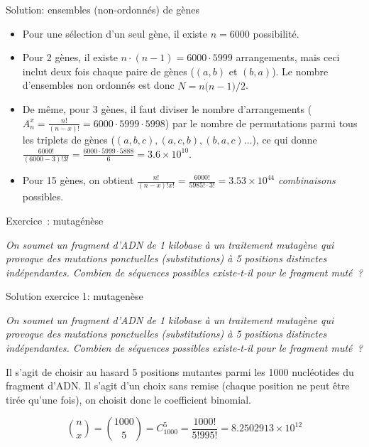 \documentclass[ignorenonframetext,]{beamer}
\providecommand{\tightlist}{%
  \setlength{\itemsep}{0pt}\setlength{\parskip}{0pt}}
\begin{document}
\begin{frame}{Solution: ensembles (non-ordonnés) de gènes}

\begin{itemize}
\tightlist
\item
  Pour une sélection d'un seul gène, il existe \(n=6000\) possibilité.
\item
  Pour 2 gènes, il existe \(n \cdot (n-1) = 6000 \cdot 5999\)
  arrangements, mais ceci inclut deux fois chaque paire de gènes
  (\((a, b)\) et \((b, a)\)). Le nombre d'ensembles non ordonnés est
  donc \(N = n \dot (n-1)/2\).
\item
  De même, pour 3 gènes, il faut diviser le nombre d'arrangements
  (\(A^x_n = \frac{n!}{(n-x)!} = 6000 \cdot 5999 \cdot 5998\)) par le
  nombre de permutations parmi tous les triplets de gènes
  (\((a, b, c), (a, c, b), (b, a, c) \ldots\)), ce qui donne
  \(\frac{6000!}{(6000-3)! 3!} = \frac{6000 \cdot 5999 \cdot 5888}{6} = 3.6\times 10^{10}\).
\item
  Pour 15 gènes, on obtient
  \(\frac{n!}{(n-x)!x!} = \frac{6000!}{5985! \cdot 3!} = 3.53\times 10^{44}\)
  \emph{combinaisons} possibles.
\end{itemize}

\end{frame}

\begin{frame}{Exercice~: mutagénèse}

\emph{On soumet un fragment d'ADN de 1 kilobase à un traitement mutagène
qui provoque des mutations ponctuelles (substitutions) à 5 positions
distinctes indépendantes. Combien de séquences possibles existe-t-il
pour le fragment muté~?}

\end{frame}

\begin{frame}{Solution exercice 1: mutagenèse}

\emph{On soumet un fragment d'ADN de 1 kilobase à un traitement mutagène
qui provoque des mutations ponctuelles (substitutions) à 5 positions
distinctes indépendantes. Combien de séquences possibles existe-t-il
pour le fragment muté~?}

Il s'agit de choisir au hasard 5 positions mutantes parmi les 1000
nucléotides du fragment d'ADN. Il s'agit d'un choix sans remise (chaque
position ne peut être tirée qu'une fois), on choisit donc le coefficient
binomial.

\[\binom{n}{x} = \binom{1000}{5} = C^5_{1000} = \frac{1000!}{5! 995!} = 8.2502913\times 10^{12}\]

\end{frame}
\end{document}
